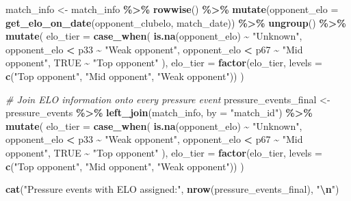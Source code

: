 \documentclass[
]{article}
\newenvironment{Shaded}{\begin{snugshade}}{\end{snugshade}}
\newcommand{\AttributeTok}[1]{\textcolor[rgb]{0.13,0.29,0.53}{#1}}
\newcommand{\CommentTok}[1]{\textcolor[rgb]{0.56,0.35,0.01}{\textit{#1}}}
\newcommand{\ConstantTok}[1]{\textcolor[rgb]{0.56,0.35,0.01}{#1}}
\newcommand{\FunctionTok}[1]{\textcolor[rgb]{0.13,0.29,0.53}{\textbf{#1}}}
\newcommand{\NormalTok}[1]{#1}
\newcommand{\OtherTok}[1]{\textcolor[rgb]{0.56,0.35,0.01}{#1}}
\newcommand{\SpecialCharTok}[1]{\textcolor[rgb]{0.81,0.36,0.00}{\textbf{#1}}}
\newcommand{\StringTok}[1]{\textcolor[rgb]{0.31,0.60,0.02}{#1}}
\begin{document}
\begin{Shaded}
\begin{Highlighting}[]
\NormalTok{match\_info }\OtherTok{\textless{}{-}}\NormalTok{ match\_info }\SpecialCharTok{\%\textgreater{}\%}
  \FunctionTok{rowwise}\NormalTok{() }\SpecialCharTok{\%\textgreater{}\%}
  \FunctionTok{mutate}\NormalTok{(}\AttributeTok{opponent\_elo =} \FunctionTok{get\_elo\_on\_date}\NormalTok{(opponent\_clubelo, match\_date)) }\SpecialCharTok{\%\textgreater{}\%}
  \FunctionTok{ungroup}\NormalTok{() }\SpecialCharTok{\%\textgreater{}\%}
  \FunctionTok{mutate}\NormalTok{(}
    \AttributeTok{elo\_tier =} \FunctionTok{case\_when}\NormalTok{(}
      \FunctionTok{is.na}\NormalTok{(opponent\_elo)    }\SpecialCharTok{\textasciitilde{}} \StringTok{"Unknown"}\NormalTok{,}
\NormalTok{      opponent\_elo }\SpecialCharTok{\textless{}}\NormalTok{ p33     }\SpecialCharTok{\textasciitilde{}} \StringTok{"Weak opponent"}\NormalTok{,}
\NormalTok{      opponent\_elo }\SpecialCharTok{\textless{}}\NormalTok{ p67     }\SpecialCharTok{\textasciitilde{}} \StringTok{"Mid opponent"}\NormalTok{,}
      \ConstantTok{TRUE}                   \SpecialCharTok{\textasciitilde{}} \StringTok{"Top opponent"}
\NormalTok{    ),}
    \AttributeTok{elo\_tier =} \FunctionTok{factor}\NormalTok{(elo\_tier,}
                      \AttributeTok{levels =} \FunctionTok{c}\NormalTok{(}\StringTok{"Top opponent"}\NormalTok{, }\StringTok{"Mid opponent"}\NormalTok{, }\StringTok{"Weak opponent"}\NormalTok{))}
\NormalTok{  )}

\CommentTok{\# Join ELO information onto every pressure event}
\NormalTok{pressure\_events\_final }\OtherTok{\textless{}{-}}\NormalTok{ pressure\_events }\SpecialCharTok{\%\textgreater{}\%}
  \FunctionTok{left\_join}\NormalTok{(match\_info, }\AttributeTok{by =} \StringTok{"match\_id"}\NormalTok{) }\SpecialCharTok{\%\textgreater{}\%}
  \FunctionTok{mutate}\NormalTok{(}
    \AttributeTok{elo\_tier =} \FunctionTok{case\_when}\NormalTok{(}
      \FunctionTok{is.na}\NormalTok{(opponent\_elo)    }\SpecialCharTok{\textasciitilde{}} \StringTok{"Unknown"}\NormalTok{,}
\NormalTok{      opponent\_elo }\SpecialCharTok{\textless{}}\NormalTok{ p33     }\SpecialCharTok{\textasciitilde{}} \StringTok{"Weak opponent"}\NormalTok{,}
\NormalTok{      opponent\_elo }\SpecialCharTok{\textless{}}\NormalTok{ p67     }\SpecialCharTok{\textasciitilde{}} \StringTok{"Mid opponent"}\NormalTok{,}
      \ConstantTok{TRUE}                   \SpecialCharTok{\textasciitilde{}} \StringTok{"Top opponent"}
\NormalTok{    ),}
    \AttributeTok{elo\_tier =} \FunctionTok{factor}\NormalTok{(elo\_tier,}
                      \AttributeTok{levels =} \FunctionTok{c}\NormalTok{(}\StringTok{"Top opponent"}\NormalTok{, }\StringTok{"Mid opponent"}\NormalTok{, }\StringTok{"Weak opponent"}\NormalTok{))}
\NormalTok{  )}

\FunctionTok{cat}\NormalTok{(}\StringTok{"Pressure events with ELO assigned:"}\NormalTok{, }\FunctionTok{nrow}\NormalTok{(pressure\_events\_final), }\StringTok{"}\SpecialCharTok{\textbackslash{}n}\StringTok{"}\NormalTok{)}
\end{Highlighting}
\end{Shaded}
\end{document}
